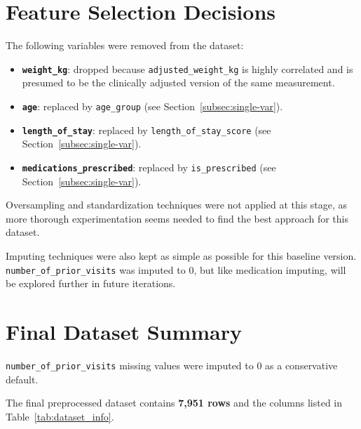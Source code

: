 \documentclass{article}
\begin{document}
\section{Feature Selection Decisions}

\par The following variables were removed from the dataset:

\begin{itemize}
  \item \textbf{\texttt{weight\_kg}}: dropped because \texttt{adjusted\_weight\_kg} is highly correlated and is presumed to be the clinically adjusted version of the same measurement.
  \item \textbf{\texttt{age}}: replaced by \texttt{age\_group} (see Section~\ref{subsec:single-var}).
  \item \textbf{\texttt{length\_of\_stay}}: replaced by \texttt{length\_of\_stay\_score} (see Section~\ref{subsec:single-var}).
  \item \textbf{\texttt{medications\_prescribed}}: replaced by \texttt{is\_prescribed} (see Section~\ref{subsec:single-var}).
\end{itemize}

\noindent Oversampling and standardization techniques were not applied at this stage,
as more thorough experimentation seems needed to find the best approach for this dataset.

\par Imputing techniques were also kept as simple as possible for this baseline version.
\texttt{number\_of\_prior\_visits} was imputed to 0, but like medication imputing, will be explored further in future iterations.

\section{Final Dataset Summary}
\label{sec:dataset-summary}

\par \texttt{number\_of\_prior\_visits} missing values were imputed to 0 as a conservative default.

\par The final preprocessed dataset contains \textbf{7,951 rows} and the columns listed in Table~\ref{tab:dataset_info}.
\end{document}
